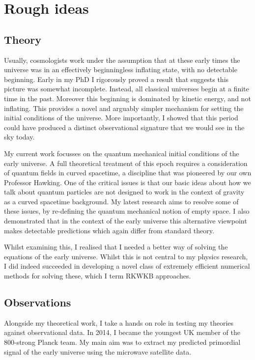 \section{Rough ideas}

\subsection{Theory}
Usually, cosmologists work under the assumption that at these early times the universe was in an effectively beginningless inflating state, with no detectable beginning. Early in my PhD I rigorously proved a result that suggests this picture was somewhat incomplete.  Instead, all classical universes begin at a finite time in the past.  Moreover this beginning is dominated by kinetic energy, and not inflating. This provides a novel and arguably simpler mechanism for setting the initial conditions of the universe. More importantly, I showed that this period could have produced a distinct observational signature that we would see in the sky today.

My current work focusses on the quantum mechanical initial conditions of the early universe. A full theoretical treatment of this epoch requires a consideration of quantum fields in curved spacetime, a discipline that was pioneered by our own Professor Hawking. One of the critical issues is that our basic ideas about how we talk about quantum particles are not designed to work in the context of gravity as a curved spacetime background. My latest research aims to resolve some of these issues, by re-defining the quantum mechanical notion of empty space. I also demonstrated that in the context of the early universe this alternative viewpoint makes detectable predictions which again differ from standard theory.

Whilst examining this, I realised that I needed a better way of solving the equations of the early universe. Whilst this is not central to my physics research, I did indeed succeeded in developing a novel class of extremely efficient numerical methods for solving these, which I term RKWKB approaches.

\subsection{Observations}
Alongside my theoretical work, I take a hands on role in testing my theories against observational data. In 2014, I became the youngest UK member of the 800-strong Planck team. My main aim was to extract my predicted primordial signal of the early universe using the microwave satellite data.

